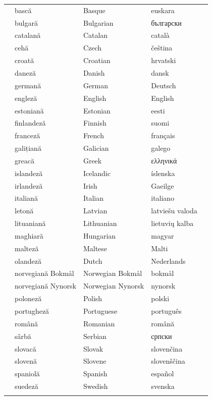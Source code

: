 \vspace*{-5mm}
\centering
  \setlength{\tabcolsep}{2em}
  \begin{tabularx}{\textwidth}{lllll} \toprule\addlinespace
&bască & Basque & euskara&\\
&bulgară & Bulgarian & български&\\
&catalană & Catalan & català&\\
&cehă & Czech & čeština&\\
&croată & Croatian & hrvatski&\\
&daneză & Danish & dansk&\\
&germană & German & Deutsch&\\
&engleză & English & English&\\
&estoniană & Estonian & eesti&\\
&finlandeză & Finnish & suomi&\\
&franceză & French & français&\\
&galițiană & Galician & galego&\\
&greacă & Greek & ελληνικά&\\
&islandeză & Icelandic & íslenska&\\
&irlandeză & Irish & Gaeilge&\\
&italiană & Italian & italiano&\\
&letonă & Latvian & latviešu valoda&\\
&lituaniană & Lithuanian & lietuvių kalba&\\
&maghiară & Hungarian & magyar&\\ 
&malteză & Maltese & Malti&\\
&olandeză & Dutch & Nederlands&\\
&norvegiană Bokmål & Norwegian Bokmål & bokmål&\\
&norvegiană Nynorsk & Norwegian Nynorsk & nynorsk&\\
&poloneză & Polish & polski&\\
&portugheză & Portuguese & português&\\
&română & Romanian & română&\\
&sârbă & Serbian & српски&\\
&slovacă & Slovak & slovenčina&\\
&slovenă & Slovene & slovenščina&\\
&spaniolă & Spanish & español&\\
&suedeză & Swedish & svenska&\\
 \addlinespace \bottomrule
\end{tabularx}

